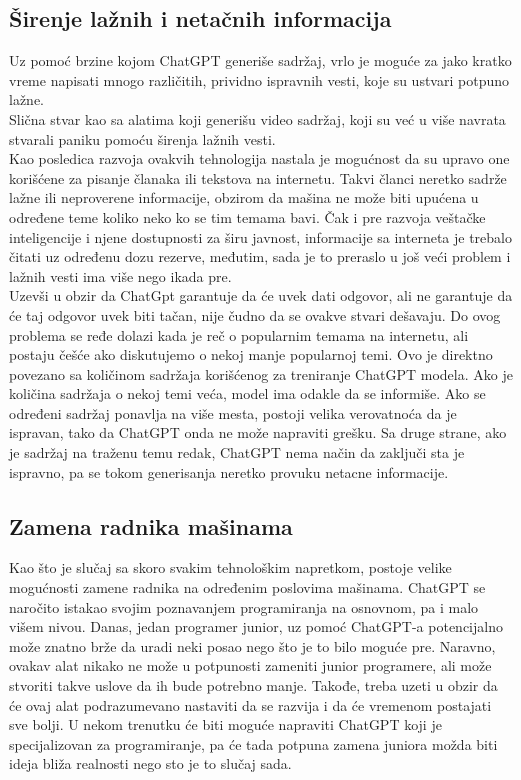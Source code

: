 \documentclass[fleqn, 12pt]{article}
\begin{document}
    \subsection{Širenje lažnih i netačnih informacija}
        \begin{text}
            Uz pomoć brzine kojom ChatGPT generiše sadržaj, vrlo je moguće za jako kratko vreme napisati mnogo različitih, prividno ispravnih vesti, koje su ustvari potpuno lažne\cite{G8}.
            \\
            Slična stvar kao sa alatima koji generišu video sadržaj, koji su već u više navrata stvarali paniku pomoću širenja lažnih vesti\cite{G8}.
            \\
            Kao posledica razvoja ovakvih tehnologija nastala je mogućnost da su upravo one korišćene za pisanje članaka ili tekstova na internetu. Takvi članci neretko sadrže lažne ili neproverene informacije, obzirom da mašina ne može biti upućena u određene teme koliko neko ko se tim temama bavi. Čak i pre razvoja veštačke inteligencije i njene dostupnosti za širu javnost, informacije sa interneta je trebalo čitati uz određenu dozu rezerve, međutim, sada je to preraslo u još veći problem i lažnih vesti ima više nego ikada pre\cite{G8}.
            \\
            Uzevši u obzir da ChatGpt garantuje da će uvek dati odgovor, ali ne garantuje da će taj odgovor uvek biti tačan, nije čudno da se ovakve stvari dešavaju. Do ovog problema se ređe dolazi kada je reč o popularnim temama na internetu, ali postaju češće ako diskutujemo o nekoj manje popularnoj temi. Ovo je direktno povezano sa količinom sadržaja korišćenog za treniranje ChatGPT modela. Ako je količina sadržaja o nekoj temi veća, model ima odakle da se informiše. Ako se određeni sadržaj ponavlja na više mesta, postoji velika verovatnoća da je ispravan, tako da ChatGPT onda ne može napraviti grešku. Sa druge strane, ako je sadržaj na traženu temu redak, ChatGPT nema način da zaključi sta je ispravno, pa se tokom generisanja neretko provuku netacne informacije\cite{G8}.
        \end{text}
\newpage
    \subsection{Zamena radnika mašinama}
        \begin{text}
            Kao što je slučaj sa skoro svakim tehnološkim napretkom, postoje velike mogućnosti zamene radnika na određenim poslovima mašinama. ChatGPT se naročito istakao svojim poznavanjem programiranja na osnovnom, pa i malo višem nivou. Danas, jedan programer junior, uz pomoć ChatGPT-a potencijalno može znatno brže da uradi neki posao nego što je to bilo moguće pre. Naravno, ovakav alat nikako ne može u potpunosti zameniti junior programere, ali može stvoriti takve uslove da ih bude potrebno manje. Takođe, treba uzeti u obzir da će ovaj alat podrazumevano nastaviti da se razvija i da će vremenom postajati sve bolji. U nekom trenutku će biti moguće napraviti ChatGPT koji je specijalizovan za programiranje, pa će tada potpuna zamena juniora možda biti ideja bliža realnosti nego sto je to slučaj sada\cite{G6}.
        \end{text}
\end{document}
